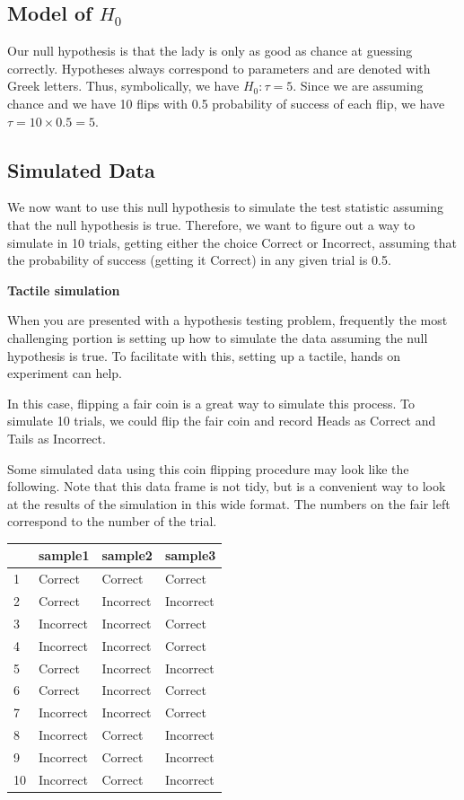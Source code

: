 \documentclass[]{tufte-book}
\begin{document}
\subsection{\texorpdfstring{Model of
\(H_0\)}{Model of H\_0}}\label{model-of-h_0}

Our null hypothesis is that the lady is only as good as chance at
guessing correctly. Hypotheses always correspond to parameters and are
denoted with Greek letters. Thus, symbolically, we have
\(H_0: \tau = 5\). Since we are assuming chance and we have 10 flips
with 0.5 probability of success of each flip, we have
\(\tau = 10 \times 0.5 = 5\).

\subsection{Simulated Data}\label{simulated-data}

We now want to use this null hypothesis to simulate the test statistic
assuming that the null hypothesis is true. Therefore, we want to figure
out a way to simulate in 10 trials, getting either the choice Correct or
Incorrect, assuming that the probability of success (getting it Correct)
in any given trial is 0.5.

\textbf{Tactile simulation}

When you are presented with a hypothesis testing problem, frequently the
most challenging portion is setting up how to simulate the data assuming
the null hypothesis is true. To facilitate with this, setting up a
tactile, hands on experiment can help.

In this case, flipping a fair coin is a great way to simulate this
process. To simulate 10 trials, we could flip the fair coin and record
Heads as Correct and Tails as Incorrect.

Some simulated data using this coin flipping procedure may look like the
following. Note that this data frame is not tidy, but is a convenient
way to look at the results of the simulation in this wide format. The
numbers on the fair left correspond to the number of the trial.

\begin{tabular}{l|l|l|l}
\hline
  & sample1 & sample2 & sample3\\
\hline
1 & Correct & Correct & Correct\\
\hline
2 & Correct & Incorrect & Incorrect\\
\hline
3 & Incorrect & Incorrect & Correct\\
\hline
4 & Incorrect & Incorrect & Correct\\
\hline
5 & Correct & Incorrect & Incorrect\\
\hline
6 & Correct & Incorrect & Correct\\
\hline
7 & Incorrect & Incorrect & Correct\\
\hline
8 & Incorrect & Correct & Incorrect\\
\hline
9 & Incorrect & Correct & Incorrect\\
\hline
10 & Incorrect & Correct & Incorrect\\
\hline
\end{tabular}
\end{document}
